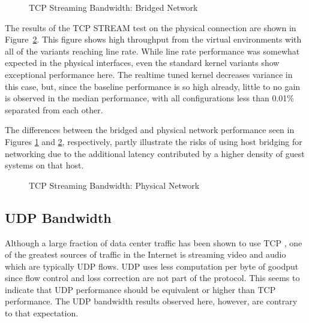 \begin{figure}
    \centering
    \def\svgwidth{\columnwidth}
    
    \caption{TCP Streaming Bandwidth: Bridged Network}
    \label{fig:tcp_stream_bridge}
\end{figure}

The results of the TCP STREAM test on the physical connection are shown in Figure~\ref{fig:tcp_stream_phys}.
This figure shows high throughput from the virtual environments with all of the variants reaching line rate.
While line rate performance was somewhat expected in the physical interfaces, even the standard kernel variants show exceptional performance here.
The realtime tuned kernel decreases variance in this case, but, since the baseline performance is so high already, little to no gain is observed in the median performance, with all configurations less than 0.01\% separated from each other.  

The differences between the bridged and physical network performance seen in Figures \ref{fig:tcp_stream_bridge} and \ref{fig:tcp_stream_phys}, respectively, partly illustrate the risks of using host bridging for networking due to the additional latency contributed by a higher density of guest systems on that host.  

\begin{figure}
    \centering
    \def\svgwidth{\columnwidth}
    
    \caption{TCP Streaming Bandwidth: Physical Network}
    \label{fig:tcp_stream_phys}
\end{figure}

\subsection{UDP Bandwidth} %
\label{sub:udpbandwidth}
Although a large fraction of data center traffic has been shown to use TCP \autocite{haTCPCloud2013}, one of the greatest sources of traffic in the Internet is streaming video and audio which are typically UDP flows.
UDP uses less computation per byte of goodput since flow control and loss correction are not part of the protocol.  
This seems to indicate that UDP performance should be equivalent or higher than TCP performance.  
The UDP bandwidth results observed here, however, are contrary to that expectation.

